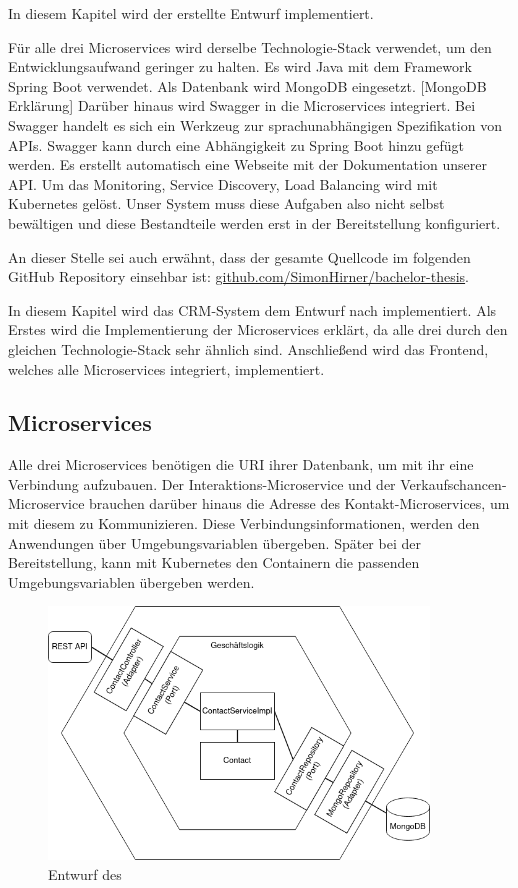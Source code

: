 In diesem Kapitel wird der erstellte Entwurf implementiert.  

Für alle drei Microservices wird derselbe Technologie-Stack verwendet, um den Entwicklungsaufwand geringer zu halten. Es wird Java mit dem Framework Spring Boot verwendet. Als Datenbank wird MongoDB eingesetzt. [MongoDB Erklärung] Darüber hinaus wird Swagger in die Microservices integriert. Bei Swagger handelt es sich ein Werkzeug zur sprachunabhängigen Spezifikation von APIs. Swagger kann durch eine Abhängigkeit zu Spring Boot hinzu gefügt werden. Es erstellt automatisch eine Webseite mit der Dokumentation unserer API. Um das Monitoring, Service Discovery, Load Balancing wird mit Kubernetes gelöst. Unser System muss diese Aufgaben also nicht selbst bewältigen und diese Bestandteile werden erst in der Bereitstellung konfiguriert.



An dieser Stelle sei auch erwähnt, dass der gesamte Quellcode im folgenden GitHub Repository einsehbar ist: \href{https://github.com/SimonHirner/bachelor-thesis}{github.com/SimonHirner/bachelor-thesis}.

In diesem Kapitel wird das CRM-System dem Entwurf nach implementiert. Als Erstes wird die Implementierung der Microservices erklärt, da alle drei durch den gleichen Technologie-Stack sehr ähnlich sind. Anschließend wird das Frontend, welches alle Microservices integriert, implementiert.

\subsection{Microservices}

Alle drei Microservices benötigen die \ac{URI} ihrer Datenbank, um mit ihr eine Verbindung aufzubauen. Der Interaktions-Microservice und der Verkaufschancen-Microservice brauchen darüber hinaus die Adresse des Kontakt-Microservices, um mit diesem zu Kommunizieren. Diese Verbindungsinformationen, werden den Anwendungen über Umgebungsvariablen übergeben. Später bei der Bereitstellung, kann mit Kubernetes den Containern die passenden Umgebungsvariablen übergeben werden.

\begin{figure}[H] 
    \centering
    \includegraphics[width=0.9\textwidth]{figures/HexagonalDesign.png}
    \caption{Entwurf des}
\end{figure}

